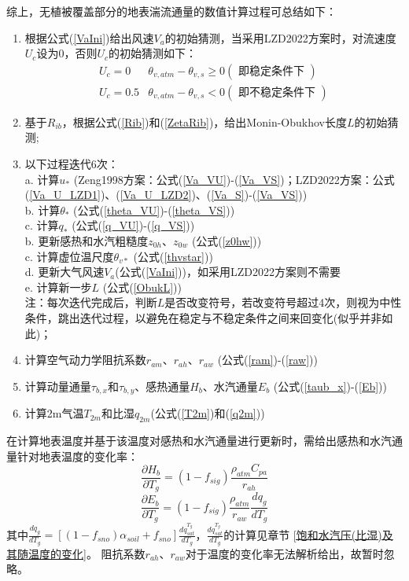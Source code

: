 综上，无植被覆盖部分的地表湍流通量的数值计算过程可总结如下：
\begin{enumerate}
     \item 根据公式(\ref{VaIni})给出风速$V_{a}$的初始猜测，当采用LZD2022方案时，对流速度$U_c$设为0，否则$U_c$的初始猜测如下：
     \begin{equation}
          \begin{array}{cc}U_{c}=0 & \theta_{v, atm}-\theta_{v, s} \geq 0(\text { 即稳定条件下 }) \\ U_{c}=0.5 & \theta_{v, atm}-\theta_{v, s}<0(\text { 即不稳定条件下 })\end{array}
          \end{equation}
     \item 基于$R_{ib}$，根据公式(\ref{Rib})和(\ref{ZetaRib})，给出Monin-Obukhov长度$L$的初始猜测;
     \item 以下过程迭代6次：\\
     a. 计算$u_\ast$ (Zeng1998方案：公式(\ref{Va_VU})-(\ref{Va_VS})；LZD2022方案：公式(\ref{Va_U_LZD1})、(\ref{Va_U_LZD2})、(\ref{Va_S})-(\ref{Va_VS})) \\
     b. 计算$\theta_\ast$ (公式(\ref{theta_VU})-(\ref{theta_VS})) \\
     c. 计算$q_\ast$ (公式(\ref{q_VU})-(\ref{q_VS})) \\
     b. 更新感热和水汽粗糙度$z_{0h}$、$z_{0w}$ (公式(\ref{z0hw})) \\
     c. 计算虚位温尺度$\theta_{v\ast}$ (公式(\ref{thvstar})) \\
     d. 更新大气风速$V_a$(公式(\ref{VaIni}))，如采用LZD2022方案则不需要\\
     e. 计算新一步$L$ (公式(\ref{ObukL})) \\
     注：每次迭代完成后，判断$L$是否改变符号，若改变符号超过4次，则视为中性条件，跳出迭代过程，以避免在稳定与不稳定条件之间来回变化(似乎并非如此)；
     \item 计算空气动力学阻抗系数$r_{am}$、$r_{ah}$、$r_{aw}$ (公式(\ref{ram})-(\ref{raw}))
     \item 计算动量通量$\tau_{b,x}$和$\tau_{b,y}$、感热通量$H_b$、水汽通量$E_b$ (公式(\ref{taub_x})-(\ref{Eb}))
     \item 计算2m气温$T_{2m}$和比湿$q_{2m}$(公式(\ref{T2m})和(\ref{q2m}))
 \end{enumerate}

 在计算地表温度并基于该温度对感热和水汽通量进行更新时，需给出感热和水汽通量针对地表温度的变化率：
\begin{equation}
     \frac{\partial H_{b}}{\partial T_{g}}=\left(1-f_{sig}\right) \frac{\rho_{atm} C_{p a}}{r_{a h}}
\end{equation}
\begin{equation}
     \frac{\partial E_{b}}{\partial T_{g}}=\left(1-f_{sig}\right) \frac{\rho_{atm}}{r_{a w}} \frac{d q_{g}}{d T_{g}}
\end{equation}
其中$\frac{dq_g}{dT_g}=\left[\left(1-f_{sno}\right)\alpha_{soil}+f_{sno}\right]\frac{dq_{sat}^{T_g}}{dT_g}$，$\frac{dq_{sat}^{T_g}}{dT_g}$的计算见章节 \ref{饱和水汽压(比湿)及其随温度的变化}。
阻抗系数$r_{ah}$、$r_{aw}$对于温度的变化率无法解析给出，故暂时忽略。


